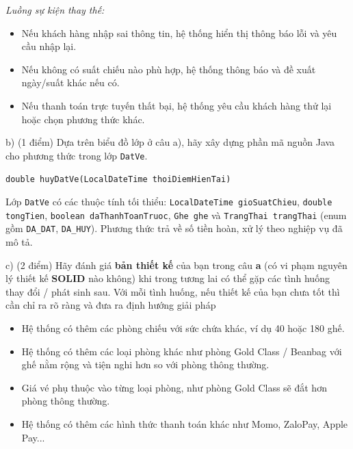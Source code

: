 \documentclass[11pt,a4paper]{article}
\begin{document}
\par\nobreak\vspace{0pt}
{\itshape\nobreak Luồng sự kiện thay thế:}
\begin{itemize}[leftmargin=1.05cm]
\item Nếu khách hàng nhập sai thông tin, hệ thống hiển thị thông báo lỗi và yêu cầu nhập lại.
\item Nếu không có suất chiếu nào phù hợp, hệ thống thông báo và đề xuất ngày/suất khác nếu có.
\item Nếu thanh toán trực tuyến thất bại, hệ thống yêu cầu khách hàng thử lại hoặc chọn phương thức khác.
\end{itemize}

\par\vspace{3pt}
\noindent b) (1 điểm) Dựa trên biểu đồ lớp ở câu a), hãy xây dựng phần mã nguồn Java cho phương thức trong lớp \texttt{DatVe}.
\begin{center}
\texttt{double huyDatVe(LocalDateTime thoiDiemHienTai)}
\end{center}
Lớp \texttt{DatVe} có các thuộc tính tối thiểu: \texttt{LocalDateTime gioSuatChieu}, \texttt{double tongTien}, \texttt{boolean daThanhToanTruoc}, \texttt{Ghe ghe} và \texttt{TrangThai trangThai} (enum gồm \texttt{DA\_DAT}, \texttt{DA\_HUY}). Phương thức trả về số tiền hoàn, xử lý theo nghiệp vụ đã mô tả.

\par\vspace{3pt}
\noindent c) (2 điểm) Hãy đánh giá \textbf{bản thiết kế} của bạn trong câu \textbf{a} (có vi phạm nguyên lý thiết kế \textbf{SOLID} nào không) khi trong tương lai có thể gặp các tình huống thay đổi / phát sinh sau. Với mỗi tình huống, nếu thiết kế của bạn chưa tốt thì cần chỉ ra rõ ràng và đưa ra định hướng giải pháp
\begin{itemize}[leftmargin=1.05cm,itemsep=0pt]
\item Hệ thống có thêm các phòng chiếu với sức chứa khác, ví dụ 40 hoặc 180 ghế.
\item Hệ thống có thêm các loại phòng khác như phòng Gold Class / Beanbag với ghế nằm rộng và tiện nghi hơn so với phòng thông thường.
\item Giá vé phụ thuộc vào từng loại phòng, như phòng Gold Class sẽ đắt hơn phòng thông thường.
\item Hệ thống có thêm các hình thức thanh toán khác như Momo, ZaloPay, Apple Pay...
\end{itemize}
\end{document}
